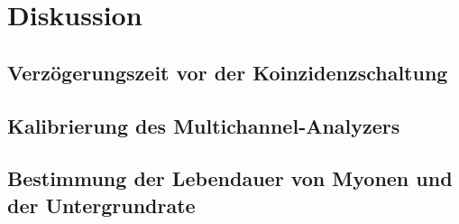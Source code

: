 \section{Diskussion}
\label{sec:Diskussion}
\subsection{Verzögerungszeit vor der Koinzidenzschaltung}

\subsection{Kalibrierung des Multichannel-Analyzers}
\subsection{Bestimmung der Lebendauer von Myonen und der Untergrundrate}
\subsection{}
